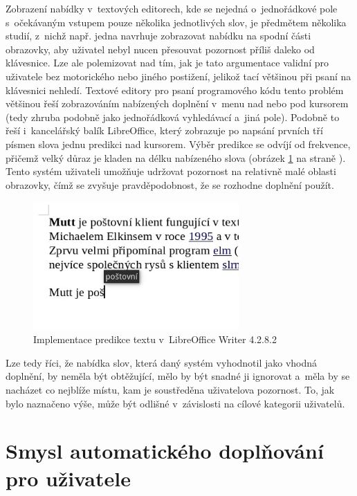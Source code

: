 \documentclass[a4paper,11pt,openany]{book} %
\begin{document}
Zobrazení nabídky v~textových editorech, kde se nejedná o~jednořádkové pole s~očekávaným vstupem pouze několika jednotlivých slov, je předmětem několika studií, z~nichž např. jedna navrhuje zobrazovat nabídku na spodní části obrazovky, aby uživatel nebyl nucen přesouvat pozornost příliš daleko od klávesnice. %
Lze ale polemizovat nad tím, jak je tato argumentace validní pro uživatele bez motorického nebo jiného postižení, jelikož tací většinou při psaní na klávesnici nehledí. Textové editory pro psaní programového kódu tento problém většinou řeší zobrazováním nabízených doplnění v~menu nad nebo pod kursorem (tedy zhruba podobně jako jednořádková vyhledávací a~jiná pole). Podobně to řeší i~kancelářský balík LibreOffice, který zobrazuje po napsání prvních tří písmen slova jednu predikci nad kursorem. Výběr predikce se odvíjí od frekvence, přičemž velký důraz je kladen na délku nabízeného slova (obrázek \ref{fig:LOpredict} na straně \pageref{fig:LOpredict}). Tento systém uživateli umožňuje udržovat pozornost na relativně malé oblasti obrazovky, čímž se zvyšuje pravděpodobnost, že se rozhodne doplnění použít. 

\begin{figure}[h]
	\centering
	\includegraphics[width=0.7\textwidth]{LO_prediction_1}
	\caption{Implementace predikce textu v~LibreOffice Writer 4.2.8.2}
	\label{fig:LOpredict}
\end{figure}

Lze tedy říci, že nabídka slov, která daný systém vyhodnotil jako vhodná doplnění, by neměla být obtěžující, mělo by být snadné ji ignorovat a~měla by se nacházet co nejblíže místu, kam je soustředěna uživatelova pozornost. To, jak bylo naznačeno výše, může být odlišné v~závislosti na cílové kategorii uživatelů.

\chapter{Smysl automatického doplňování pro uživatele}
\end{document}
